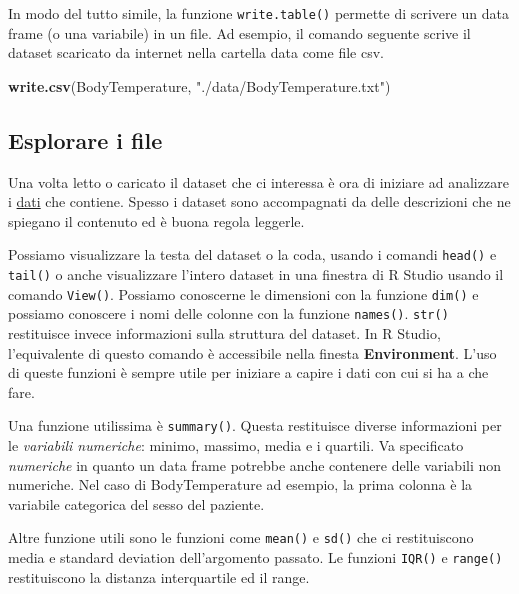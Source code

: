 \documentclass[]{book}
\newenvironment{Shaded}{\begin{snugshade}}{\end{snugshade}}
\newcommand{\KeywordTok}[1]{\textcolor[rgb]{0.13,0.29,0.53}{\textbf{#1}}}
\newcommand{\NormalTok}[1]{#1}
\newcommand{\StringTok}[1]{\textcolor[rgb]{0.31,0.60,0.02}{#1}}
\begin{document}
In modo del tutto simile, la funzione \texttt{write.table()} permette di scrivere un data frame (o una variabile) in un file. Ad esempio, il comando seguente scrive il dataset scaricato da internet nella cartella data come file csv.

\begin{Shaded}
\begin{Highlighting}[]
\KeywordTok{write.csv}\NormalTok{(BodyTemperature, }\StringTok{"./data/BodyTemperature.txt"}\NormalTok{)}
\end{Highlighting}
\end{Shaded}

\hypertarget{esplorare-i-file}{%
\subsection{Esplorare i file}\label{esplorare-i-file}}

Una volta letto o caricato il dataset che ci interessa è ora di iniziare ad analizzare i \href{http://phdcomics.com/comics.php?f=1816}{dati} che contiene. Spesso i dataset sono accompagnati da delle descrizioni che ne spiegano il contenuto ed è buona regola leggerle.

Possiamo visualizzare la testa del dataset o la coda, usando i comandi \texttt{head()} e \texttt{tail()} o anche visualizzare l'intero dataset in una finestra di R Studio usando il comando \texttt{View()}. Possiamo conoscerne le dimensioni con la funzione \texttt{dim()} e possiamo conoscere i nomi delle colonne con la funzione \texttt{names()}.
\texttt{str()} restituisce invece informazioni sulla struttura del dataset. In R Studio, l'equivalente di questo comando è accessibile nella finesta \textbf{Environment}. L'uso di queste funzioni è sempre utile per iniziare a capire i dati con cui si ha a che fare.

Una funzione utilissima è \texttt{summary()}. Questa restituisce diverse informazioni per le \emph{variabili numeriche}: minimo, massimo, media e i quartili. Va specificato \emph{numeriche} in quanto un data frame potrebbe anche contenere delle variabili non numeriche. Nel caso di BodyTemperature ad esempio, la prima colonna è la variabile categorica del sesso del paziente.

Altre funzione utili sono le funzioni come \texttt{mean()} e \texttt{sd()} che ci restituiscono media e standard deviation dell'argomento passato.
Le funzioni \texttt{IQR()} e \texttt{range()} restituiscono la distanza interquartile ed il range.
\end{document}
